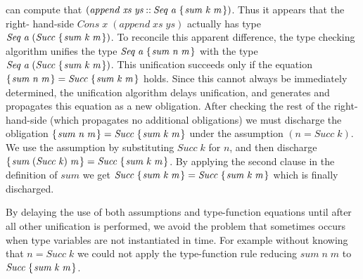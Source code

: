 \documentclass[10pt]{article}
\newcommand{\Conid}[1]{\mathit{#1}}
\newcommand{\Varid}[1]{\mathit{#1}}
\begin{document}
can compute that \ensuremath{(\Varid{append}\;\Varid{xs}\;\Varid{ys}\mathbin{::}\Conid{Seq}\;\Varid{a}\;\{\mskip1.5mu \Varid{sum}\;\Varid{k}\;\Varid{m}\mskip1.5mu\})}. Thus it appears that the
right- hand-side \ensuremath{\Conid{Cons}\;\Varid{x}\;(\Varid{append}\;\Varid{xs}\;\Varid{ys})} actually has type \ensuremath{\Conid{Seq}\;\Varid{a}\;(\Conid{Succ}\;\{\mskip1.5mu \Varid{sum}\;\Varid{k}\;\Varid{m}\mskip1.5mu\})}. To reconcile this apparent difference, the type checking algorithm
unifies the type \ensuremath{\Conid{Seq}\;\Varid{a}\;\{\mskip1.5mu \Varid{sum}\;\Varid{n}\;\Varid{m}\mskip1.5mu\}} with the type \ensuremath{\Conid{Seq}\;\Varid{a}\;(\Conid{Succ}\;\{\mskip1.5mu \Varid{sum}\;\Varid{k}\;\Varid{m}\mskip1.5mu\})}. This
unification succeeds only if the equation \ensuremath{\{\mskip1.5mu \Varid{sum}\;\Varid{n}\;\Varid{m}\mskip1.5mu\}\mathrel{=}\Conid{Succ}\;\{\mskip1.5mu \Varid{sum}\;\Varid{k}\;\Varid{m}\mskip1.5mu\}} holds. Since
this cannot always be immediately determined, the unification algorithm
delays unification, and generates and propagates this equation as a new obligation.
After checking
the rest of the right-hand-side (which propagates no additional obligations)
we must discharge the obligation \ensuremath{\{\mskip1.5mu \Varid{sum}\;\Varid{n}\;\Varid{m}\mskip1.5mu\}\mathrel{=}\Conid{Succ}\;\{\mskip1.5mu \Varid{sum}\;\Varid{k}\;\Varid{m}\mskip1.5mu\}} under the assumption \ensuremath{(\Varid{n}\mathrel{=}\Conid{Succ}\;\Varid{k})}.
We use the assumption by substituting \ensuremath{\Conid{Succ}\;\Varid{k}} for \ensuremath{\Varid{n}}, and then discharge \ensuremath{\{\mskip1.5mu \Varid{sum}\;(\Conid{Succ}\;\Varid{k})\;\Varid{m}\mskip1.5mu\}\mathrel{=}\Conid{Succ}\;\{\mskip1.5mu \Varid{sum}\;\Varid{k}\;\Varid{m}\mskip1.5mu\}}. By applying the second clause in the definition of
\ensuremath{\Varid{sum}} we get \ensuremath{\Conid{Succ}\;\{\mskip1.5mu \Varid{sum}\;\Varid{k}\;\Varid{m}\mskip1.5mu\}\mathrel{=}\Conid{Succ}\;\{\mskip1.5mu \Varid{sum}\;\Varid{k}\;\Varid{m}\mskip1.5mu\}} which is finally discharged.

By delaying the use of both assumptions and type-function equations until
after all other unification is performed, we avoid the problem that sometimes
occurs when type variables are not instantiated in time. For example
without knowing that \ensuremath{\Varid{n}\mathrel{=}\Conid{Succ}\;\Varid{k}} we could not apply the type-function
rule reducing \ensuremath{\Varid{sum}\;\Varid{n}\;\Varid{m}} to \ensuremath{\Conid{Succ}\;\{\mskip1.5mu \Varid{sum}\;\Varid{k}\;\Varid{m}\mskip1.5mu\}}. 
\end{document}
